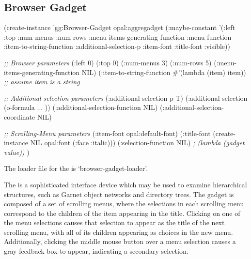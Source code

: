 \begin{group}
\section{Browser Gadget}
\label{browser-gadget}

\begin{programexample}
(create-instance 'gg:Browser-Gadget opal:aggregadget
   (:maybe-constant '(:left :top :num-menus :num-rows :menu-items-generating-function
                      :menu-function :item-to-string-function :additional-selection-p
		      :item-font :title-font :visible))

   {\it ;; Browser parameters}
   (:left 0)
   (:top 0)
   (:num-menus 3)
   (:num-rows 5)
   (:menu-items-generating-function NIL)
   (:item-to-string-function \#'(lambda (item) item))  {\it ;; assume item is a string}

   {\it ;; Additional-selection parameters}
   (:additional-selection-p T)
   (:additional-selection (o-formula ... ))
   (:additional-selection-function NIL)
   (:additional-selection-coordinate NIL)

   {\it ;; Scrolling-Menu parameters}
   (:item-font opal:default-font)
   (:title-font (create-instance NIL opal:font (:face :italic)))
   (:selection-function NIL)   {\it ; (lambda (gadget value))}
   )
\end{programexample}
\end{group}

\begin{center}
\end{center}

The loader file for the  is `browser-gadget-loader'.

The  is a sophisticated interface device which may
be used to examine hierarchical structures, such as Garnet object
networks and directory trees.  The gadget is composed of a set of
scrolling menus, where the selections in each scrolling menu
correspond to the children of the item appearing in the title.
Clicking on one of the menu selections causes that selection to appear
as the title of the next scrolling menu, with all of its children
appearing as choices in the new menu.  Additionally, clicking the
middle mouse button over a menu selection causes a gray feedback box
to appear, indicating a secondary selection.

